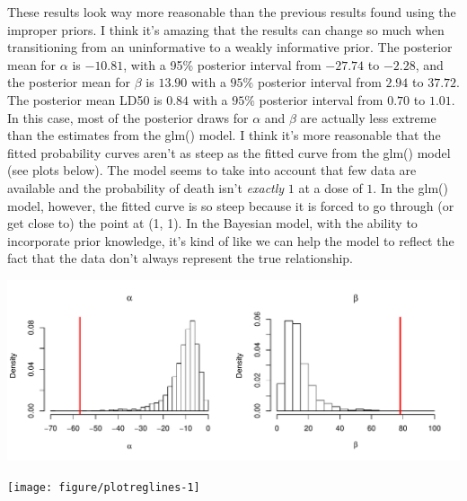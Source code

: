 \documentclass[12pt]{article}\usepackage[]{graphicx}\usepackage[]{color}
\newenvironment{knitrout}{}{} %
\begin{document}
\begin{enumerate}
\begin{enumerate}
These results look way more reasonable than the previous results found using the improper priors. I think it's amazing that the results can change so much when transitioning from an uninformative to a weakly informative prior. The posterior mean for $\alpha$ is $-10.81$, with a 95\% posterior interval from $-27.74$ to $-2.28$, and the posterior mean for $\beta$ is $13.90$ with a $95\%$ posterior interval from $2.94$ to $37.72$. The posterior mean LD50 is $0.84$ with a $95\%$ posterior interval from $0.70$ to $1.01$.\\
 
In this case, most of the posterior draws for $\alpha$ and $\beta$ are actually less extreme than the estimates from the glm() model. I think it's more reasonable that the fitted probability curves aren't as steep as the fitted curve from the glm() model (see plots below). The model seems to take into account that few data are available and the probability of death isn't {\it exactly} $1$ at a dose of $1$. In the glm() model, however, the fitted curve is so steep because it is forced to go through (or get close to) the point at (1, 1). In the Bayesian model, with the ability to incorporate prior knowledge, it's kind of like we can help the model to reflect the fact that the data don't always represent the true relationship. 



\begin{knitrout}\footnotesize
{}\color{fgcolor}
\includegraphics[width=\linewidth]{figure/compare4-1} 

\end{knitrout}

\begin{knitrout}\footnotesize
{}\color{fgcolor}
\texttt{[image: figure/plotreglines-1]} 

\end{knitrout}


\end{enumerate}
\end{enumerate}
\end{document}
